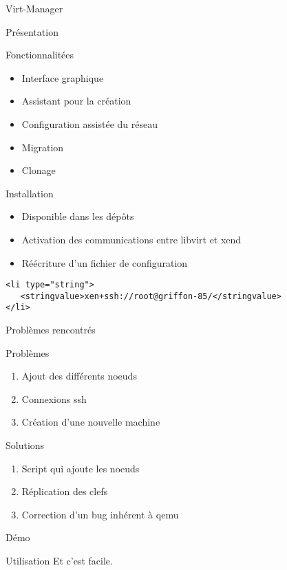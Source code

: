 
\begin{frame}
  \begin{center}
   \huge{Virt-Manager}
  \end{center}
\end{frame}

\begin{frame}{Présentation}
  \begin{block}{Fonctionnalitées}
    \begin{itemize}
    \item Interface graphique
      \pause
    \item Assistant pour la création
      \pause
    \item Configuration assistée du réseau
      \pause
    \item Migration
      \pause
    \item Clonage
    \end{itemize}
  \end{block}
\end{frame}
\begin{frame}[fragile]{Installation}
  \begin{itemize}
    \item Disponible dans les dépôts
\pause
    \item Activation des communications entre libvirt et xend
\pause
    \item Réécriture d'un fichier de configuration
  \end{itemize}
\begin{lstlisting}
<li type="string">
   <stringvalue>xen+ssh://root@griffon-85/</stringvalue>
</li>
\end{lstlisting}
\end{frame}
\begin{frame}{Problèmes rencontrés}
 \begin{alertblock}{Problèmes}
   \begin{enumerate}
     \item Ajout des différents noeuds
       \pause
     \item Connexions ssh
       \pause
     \item Création d'une nouvelle machine
       \pause
   \end{enumerate}
 \end{alertblock}
\pause
 \begin{exampleblock}{Solutions}
   \begin{enumerate}
     \item Script qui ajoute les noeuds
       \pause
     \item Réplication des clefs
       \pause
     \item Correction d'un bug inhérent à qemu
   \end{enumerate}
 \end{exampleblock}
\end{frame}

\begin{frame}{Démo}
\end{frame}

\begin{frame}{Utilisation}
  Et c'est facile.
\end{frame}

